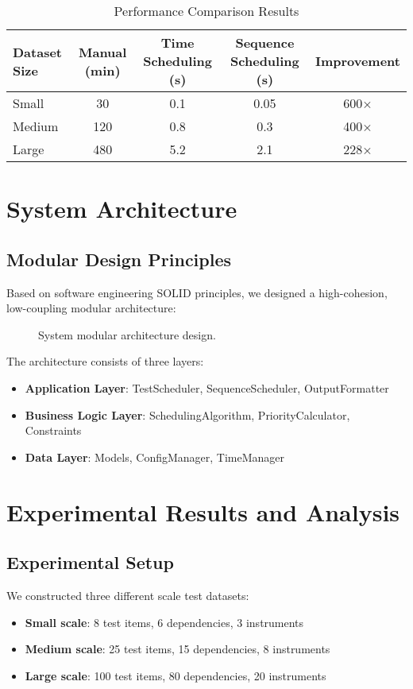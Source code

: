 \documentclass[journal]{IEEEtran}
\begin{document}
\begin{table}[!t]
\caption{Performance Comparison Results}
\label{tab:performance}
\centering
\begin{tabular}{@{}lcccc@{}}
\toprule
Dataset Size & Manual (min) & Time Scheduling (s) & Sequence Scheduling (s) & Improvement \\
\midrule
Small & 30 & 0.1 & 0.05 & 600× \\
Medium & 120 & 0.8 & 0.3 & 400× \\
Large & 480 & 5.2 & 2.1 & 228× \\
\bottomrule
\end{tabular}
\end{table}

\section{System Architecture}

\subsection{Modular Design Principles}
Based on software engineering SOLID principles, we designed a high-cohesion, low-coupling modular architecture:

\begin{figure}[!t]
\centering
\caption{System modular architecture design.}
\label{fig:architecture}
\end{figure}

The architecture consists of three layers:
\begin{itemize}
\item \textbf{Application Layer}: TestScheduler, SequenceScheduler, OutputFormatter
\item \textbf{Business Logic Layer}: SchedulingAlgorithm, PriorityCalculator, Constraints
\item \textbf{Data Layer}: Models, ConfigManager, TimeManager
\end{itemize}

\section{Experimental Results and Analysis}

\subsection{Experimental Setup}
We constructed three different scale test datasets:
\begin{itemize}
\item \textbf{Small scale}: 8 test items, 6 dependencies, 3 instruments
\item \textbf{Medium scale}: 25 test items, 15 dependencies, 8 instruments
\item \textbf{Large scale}: 100 test items, 80 dependencies, 20 instruments
\end{itemize}
\end{document}
